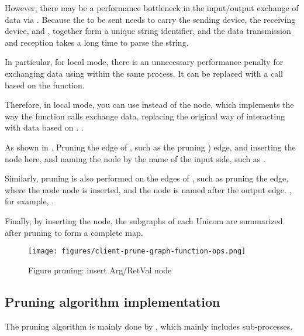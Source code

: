 \begin{content}
However, there may be a performance bottleneck in the input/output exchange of data via . Because the  to be sent needs to carry the sending device, the receiving device, and , together form a unique string identifier, and the data transmission and reception takes a long time to parse the string.

In particular, for local mode, there is an unnecessary performance penalty for exchanging data using  within the same process. It can be replaced with a call based on the  function.

Therefore, in local mode, you can use  instead of the  node, which implements the way the function calls exchange data, replacing the original way of interacting with data based on . .

As shown in . Pruning the edge of , such as the pruning ) edge, and inserting the node  here, and naming the node by the name of the input side, such as .

Similarly, pruning is also performed on the edges of , such as pruning the  edge, where the node  node is inserted, and the node is named after the output edge. , for example, .

Finally, by inserting the  node, the subgraphs of each Unicom are summarized after pruning to form a complete  map.

\begin{figure}[H]
\centering
\texttt{[image: figures/client-prune-graph-function-ops.png]}
\caption{Figure pruning: insert Arg/RetVal node}
 \label{fig:client-prune-graph-function-ops}
\end{figure}

\subsection{Pruning algorithm implementation}

The pruning algorithm is mainly done by , which mainly includes  sub-processes.

\begin{enum}
\end{enum}


\end{content}
